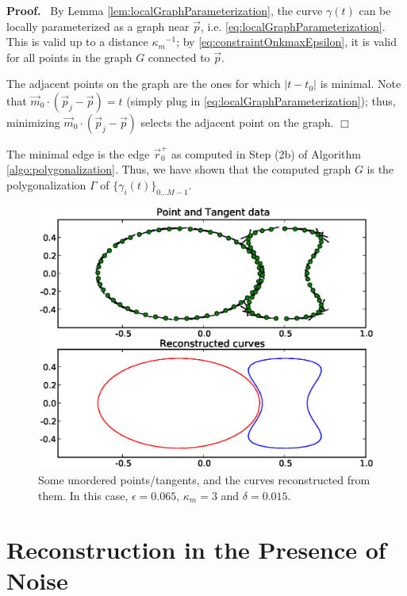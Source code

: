\documentclass{article}
\newenvironment{proof}{
  \noindent\textbf{Proof.}\ }{\hspace*{\fill}
  \begin{math}\Box\end{math}\medskip}
\numberwithin{cntr}{section}
\numberwithin{equation}{section}
\newcommand{\abs}[1]{\left| #1 \right|}%
\newcommand{\vp}[0]{{\vec{p}}}
\newcommand{\vr}[0]{{\vec{r}}}
\newcommand{\vm}[0]{{\vec{m}}}
\newcommand{\Oto}[1]{{0 \ldots #1-1}}
\newcommand{\curveSet}{{ \{ \gamma_i(t) \}_{\Oto{M}}}}
\newcommand{\curvemax}{{\kappa_{m}}}
\newcommand{\curvemaxi}{{\curvemax^{-1}}}
\begin{document}
\begin{proof}
  By Lemma \ref{lem:localGraphParameterization}, the curve $\gamma(t)$ can be locally parameterized as a graph near $\vp$, i.e. \eqref{eq:localGraphParameterization}. This is valid up to a distance $\curvemaxi$; by \eqref{eq:constraintOnkmaxEpsilon}, it is valid for all points in the graph $G$ connected to $\vp$.

The adjacent points on the graph are the ones for which $\abs{t-t_{0}}$ is minimal. Note that $\vm_{0} \cdot (\vp_{j} - \vp) = t$ (simply plug in \eqref{eq:localGraphParameterization}); thus, minimizing $\vm_{0} \cdot (\vp_{j} - \vp)$ selects the adjacent point on the graph.
\end{proof}

The minimal edge is the edge $\vr^{+}_{0}$ as computed in Step (2b) of Algorithm \ref{algo:polygonalization}.
Thus, we have shown that the computed graph $G$ is the polygonalization
$\Gamma$ of $\curveSet$.

\begin{figure}
\setlength{\unitlength}{0.240900pt}
\ifx\plotpoint\undefined\newsavebox{\plotpoint}\fi
\sbox{\plotpoint}{\rule[-0.200pt]{0.400pt}{0.400pt}}%
\includegraphics[scale=0.5]{example1.eps}

\caption{Some unordered points/tangents, and the curves reconstructed from them. In this case, $\epsilon=0.065$, $\curvemax=3$ and $\delta=0.015$.}
\label{fig:basicExample}
\end{figure}

\section{Reconstruction in the Presence of Noise}
\end{document}
